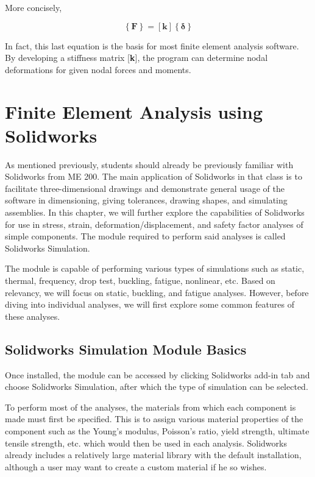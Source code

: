 \documentclass[
10pt,
a4paper,
openany,
svgnames,
]{book}
\begin{document}
More concisely,

\begin{equation}
  \left\{ \mathbf{F} \right\} = \left[ \mathbf{k} \right]\left\{ \bm\delta \right\}
\end{equation}

In fact, this last equation is the basis for most finite element analysis
software. By developing a stiffness matrix [{\textbf k}], the program can determine nodal deformations for given nodal forces and moments.

\section{Finite Element Analysis using Solidworks}

As mentioned previously, students should already be previously familiar with Solidworks from ME 200. The main application of Solidworks in that class is to facilitate three-dimensional drawings and demonstrate general usage of the software in dimensioning, giving tolerances, drawing shapes, and simulating assemblies. In this chapter, we will further explore the capabilities of Solidworks for use in stress, strain, deformation/displacement, and safety factor analyses of simple components. The module required to perform said analyses is called Solidworks Simulation.

The module is capable of performing various types of simulations such as static, thermal, frequency, drop test, buckling, fatigue, nonlinear, etc. Based on relevancy, we will focus on static, buckling, and fatigue analyses. However, before diving into individual analyses, we will first explore some common features of these analyses.

\subsection{Solidworks Simulation Module Basics}

Once installed, the module can be accessed by clicking Solidworks add-in tab and choose Solidworks Simulation, after which the type of simulation can be selected.

To perform most of the analyses, the materials from which each component is made must first be specified. This is to assign various material properties of the component such as the Young’s modulus, Poisson’s ratio, yield strength, ultimate tensile strength, etc. which would then be used in each analysis. Solidworks already includes a relatively large material library with the default installation, although a user may want to create a custom material if he so wishes.
\end{document}
